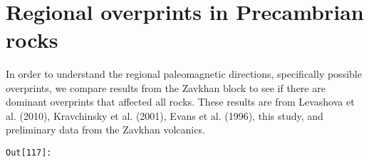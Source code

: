 \documentclass[11pt]{article}
\begin{document}
    
    \begin{center}
    \end{center}
    { \hspace*{\fill} \\}
    
    \section{Regional overprints in Precambrian
rocks}\label{regional-overprints-in-precambrian-rocks}

    In order to understand the regional paleomagnetic directions,
specifically possible overprints, we compare results from the Zavkhan
block to see if there are dominant overprints that affected all rocks.
These results are from Levashova et al. (2010), Kravchinsky et al.
(2001), Evans et al. (1996), this study, and preliminary data from the
Zavkhan volcanics.

\texttt{\color{outcolor}Out[{\color{outcolor}117}]:}
    
\end{document}
